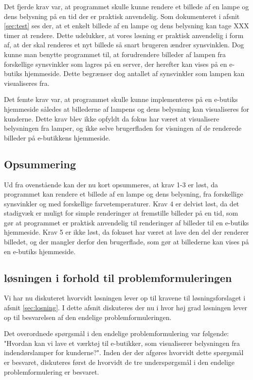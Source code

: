 Det fjerde krav var, at programmet skulle kunne rendere et billede af en lampe og dens belysning på en tid der er praktisk anvendelig. Som dokumenteret i afsnit \ref{sec:test} ses der, at et enkelt billede af en lampe og dens belysning kan tage XXX timer at rendere. Dette udelukker, at vores løsning er praktisk anvendelig i form af, at der skal renderes et nyt billede så snart brugeren ændrer synsvinklen. Dog kunne man benytte programmet til, at forudrendere billeder af lampen fra forskellige synsvinkler som lagres på en server, der herefter kan vises på en e-butiks hjemmeside. Dette begrænser dog antallet af synsvinkler som lampen kan visualiseres fra. 

Det femte krav var, at programmet skulle kunne implementeres på en e-butiks hjemmeside således at billederne af lampens og dens belysning kan visualiseres for kunderne. Dette krav blev ikke opfyldt da fokus har været at visualisere belysningen fra lamper, og ikke selve brugerfladen for visningen af de renderede billeder på e-butikkens hjemmeside.  

\subsection*{Opsummering}

Ud fra ovenstående kan der nu kort opsummeres, at krav 1-3 er løst, da programmet kan rendere et billede af en lampe og dens belysning, fra forskellige synsvinkler og med forskellige farvetemperaturer. Krav 4 er delvist løst, da det stadigvæk er muligt for simple renderinger at fremstille billeder på en tid, som gør at programmet er praktisk anvendelig til renderinger af billeder til en e-butiks hjemmeside. Krav 5 er ikke løst, da fokuset har været at lave den del der renderer billedet, og der mangler derfor den brugerflade, som gør at billederne kan vises på en e-butiks hjemmeside. 

\subsection{løsningen i forhold til problemformuleringen}
 Vi har nu diskuteret hvorvidt løsningen lever op til kravene til løsningsforslaget i afsnit \ref{sec:losning}. I dette afsnit diskuteres der nu i hvor høj grad løsningen lever op til besvarelsen af den endelige problemformuleringen.

Det overordnede spørgsmål i den endelige problemformulering var følgende: "Hvordan kan vi lave et værktøj til e-butikker, som visualiserer belysningen fra indendørslamper for kunderne?". Inden der der afgøres hvorvidt dette spørgsmål er besvaret, diskuteres først de hvorvidt de tre underspørgsmål i den endelige problemformulering er besvaret.

